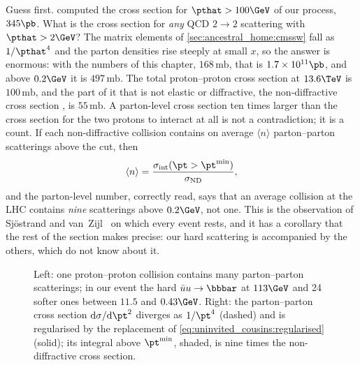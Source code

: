 Guess first.  computed the cross section for
$\pthat>100\GeV$ of our process, $345\pb$. What is the cross section for
\emph{any} QCD $2\to2$ scattering with $\pthat>2\GeV$? The matrix elements
of \cref{sec:ancestral_home:cmssw} fall as $1/\pthat^4$ and the parton
densities rise steeply at small $x$, so the answer is enormous: with the
numbers of this chapter, $168\,\mathrm{mb}$, that is $1.7\times10^{11}\pb$,
and above $0.2\GeV$ it is $497\,\mathrm{mb}$. The total proton--proton cross
section at $13.6\TeV$ is $100\,\mathrm{mb}$, and the part of it that is not
elastic or diffractive, the non-diffractive cross section \signd, is
$55\,\mathrm{mb}$. A parton-level cross section ten times larger than the
cross section for the two protons to interact at all is not a
contradiction; it is a count. If each non-diffractive collision contains on
average $\langle n\rangle$ parton--parton scatterings above the cut, then
\begin{equation}
  \langle n\rangle=\frac{\sigint(\pt>\pt^{\min})}{\signd},
  \label{eq:uninvited_cousins:nmean}
\end{equation}
and the parton-level number, correctly read, says that an average collision
at the LHC contains \emph{nine} scatterings above $0.2\GeV$, not one. This
is the observation of Sj\"ostrand and van~Zijl~\cite{Sjostrand:1987su} on
which every \PYTHIA event rests, and it has a corollary that the rest of the
section makes precise: our hard scattering is accompanied by the others,
which do not know about it.

\begin{figure}[htbp]\centering
\resizebox{\textwidth}{!}{}
\caption[One collision, many scatterings, and the regularised cross
section]{Left: one proton--proton collision contains many parton--parton
scatterings; in our event the hard $\bar uu\to\bbbar$ at $113\GeV$ and 24
softer ones between $11.5$ and $0.43\GeV$. Right: the parton--parton cross
section $\mathrm{d}\sigma/\mathrm{d}\pt^2$ diverges as $1/\pt^4$ (dashed)
and is regularised by the replacement of \cref{eq:uninvited_cousins:regularised}
(solid); its integral above $\pt^{\min}$, shaded, is nine times the
non-diffractive cross section.}
\label{fig:uninvited_cousins:two_protons_sketch}
\end{figure}


